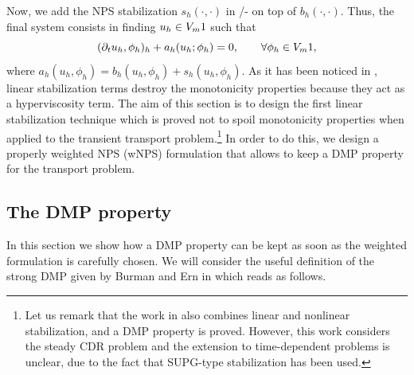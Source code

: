 Now, we add the NPS stabilization $s_h(\cdot,\cdot)$ in /- on top of  $b_h(\cdot,\cdot)$. Thus, the final system consists in finding $u_h\in V_m1$ such that
\begin{equation}
\label{eq-eq22}
(\partial_t u_h, \phi_h)_h + a_h(u_h;\phi_h) =0, \qquad \forall \phi_h \in V_m1,
\end{equation}
where $a_h(u_h,\phi_h) = b_h(u_h,\phi_h) + s_h(u_h,\phi_h)$. As it has been noticed in \cite{ern_weighting_2012}, linear stabilization terms destroy the monotonicity properties because they act as a hyperviscosity term. The aim of this section is to design the first linear stabilization technique which is proved not to spoil monotonicity properties when applied to the transient transport problem.\footnote{Let us remark that the work in \cite{burman_stabilized_2005} also combines linear and nonlinear stabilization, and a DMP property is proved. However, this work considers the steady CDR problem and the extension to time-dependent problems is unclear, due to the fact that SUPG-type stabilization has been used.} In  order to do this, we design a properly weighted NPS (wNPS) formulation that allows to keep a DMP property for the transport problem.%



\subsection{The DMP property}\label{secDMPp}

In this section we  show how a DMP property  can be kept as soon as the weighted formulation is carefully chosen. We will consider the useful definition of the strong DMP given by Burman and Ern in \cite{burman_stabilized_2005,burman_nonlinear_2007} which reads  as follows.

